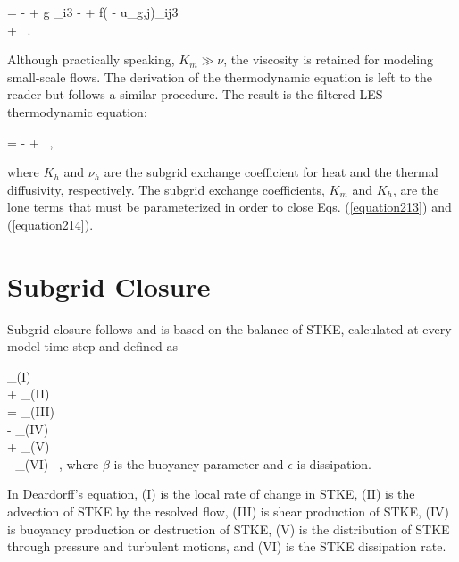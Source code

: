 \bea
{} = - + g \delta_{i3} - + f( - u_{g,j})\epsilon_{ij3} 
\nonumber \\ +   \mbox{ .}
\label{equation213}
\eea


\noindent Although practically speaking, $K_m \gg \nu$, the viscosity is retained for modeling small-scale flows. The derivation of the thermodynamic equation is left to the reader but follows a similar procedure. The result is the filtered LES thermodynamic equation:


\be
{} = -  +   \mbox{ ,}
\label{equation214}
\ee


\noindent where $K_h$ and $\nu_h$ are the subgrid exchange coefficient for heat and the thermal diffusivity, respectively. The subgrid exchange coefficients, $K_m$ and $K_h$, are the lone terms that must be parameterized in order to close Eqs. (\autoref{equation213}) and (\autoref{equation214}).

\section{Subgrid Closure}
\label{sg-close-22}

Subgrid closure follows  \citet{Deardorff1980} and is based on the balance of STKE, calculated at every model time step and defined as

  
\be
{}_{(I)}\\
+ _{(II)}\\
= _{(III)} \\
- _{(IV)} \\
+ _{(V)}\\
- _{(VI)} \mbox{ ,}
\label{equation215}
\ee
\noindent
 where $\beta$ is the buoyancy parameter and $\epsilon$ is dissipation.

In Deardorff's equation, (I) is the local rate of change in STKE, (II) is the advection of STKE by the resolved flow, (III) is shear production of STKE, (IV) is buoyancy production or destruction of STKE, (V) is the distribution of STKE through pressure and turbulent motions, and (VI) is the STKE dissipation rate.

